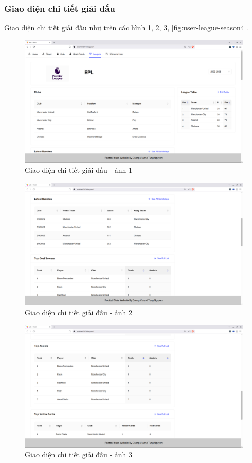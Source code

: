 \documentclass[../BTL.tex]{subfiles}
\begin{document}
\subsubsection{ Giao diện chi tiết giải đấu}
Giao diện chi tiết giải đấu như trên các hình \ref{fig:user-league-season1}, \ref{fig:user-league-season2}, \ref{fig:user-league-season3}, \ref{fig:user-league-season4}.
\begin{figure}
    \centering
    \includegraphics[width=1\linewidth]{Hinhve/user-league-season1.png}
    \caption{ Giao diện chi tiết giải đấu - ảnh 1}
    \label{fig:user-league-season1}
\end{figure}
\begin{figure}
    \centering
    \includegraphics[width=1\linewidth]{Hinhve/user-league-season2.png}
    \caption{ Giao diện chi tiết giải đấu - ảnh 2}
    \label{fig:user-league-season2}
\end{figure}
\begin{figure}
    \centering
    \includegraphics[width=1\linewidth]{Hinhve/user-league-season3.png}
    \caption{ Giao diện chi tiết giải đấu - ảnh 3}
    \label{fig:user-league-season3}
\end{figure}
\end{document}
